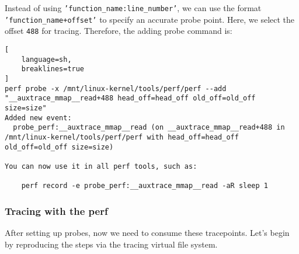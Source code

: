 \documentclass[11pt]{diazessay} %
\def\code#1{\texttt{#1}}
\begin{document}
Instead of using \code{'function\_name:line\_number'}, we can use the format
\code{'function\_name+offset'} to specify an accurate probe point. Here,
we select the offset \code{488} for tracing. Therefore, the adding probe
command is:

\begin{lstlisting}[
  	language=sh,
	breaklines=true
]
perf probe -x /mnt/linux-kernel/tools/perf/perf --add "__auxtrace_mmap__read+488 head_off=head_off old_off=old_off size=size"
Added new event:
  probe_perf:__auxtrace_mmap__read (on __auxtrace_mmap__read+488 in /mnt/linux-kernel/tools/perf/perf with head_off=head_off old_off=old_off size=size)

You can now use it in all perf tools, such as:

	perf record -e probe_perf:__auxtrace_mmap__read -aR sleep 1
\end{lstlisting}

\subsubsection*{Tracing with the perf}

After setting up probes, now we need to consume these tracepoints. Let's begin
by reproducing the steps via the tracing virtual file system.
\end{document}
